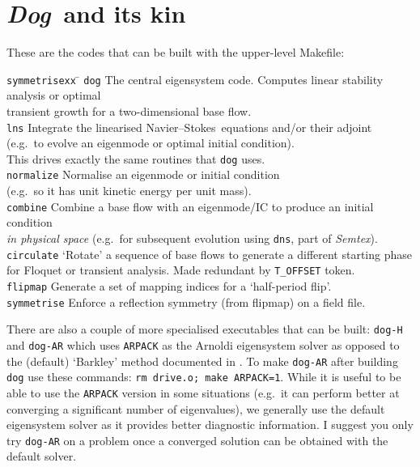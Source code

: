 \documentclass[11pt,a4paper]{report}
\newcommand\NavSto{Navier--Stokes}
\newcommand{\eg}{e.g.\ }
\newcommand{\Semtex}{\emph{Semtex}}
\newcommand{\Dog}{\emph{Dog}}
\begin{document}
\section{\Dog\ and its kin}

These are the codes that can be built with the upper-level Makefile:
\begin{tabbing}
\texttt{symmetrisexx} \= \kill
% 
\texttt{dog} 
\> The central eigensystem code. Computes linear stability analysis or 
optimal \\
\> transient growth for a two-dimensional base flow.\\
%
\texttt{lns} 
\> Integrate the linearised \NavSto\ equations and/or their adjoint\\ 
\> (\eg to evolve an eigenmode or optimal initial condition).\\ 
\> This drives exactly the same routines that \texttt{dog} uses.\\
%
\texttt{normalize} 
\> Normalise an eigenmode or initial condition \\
\> (\eg so it has unit kinetic energy per unit mass).\\
%
\texttt{combine} 
\> Combine a base flow with an eigenmode/IC to
produce an initial condition \\ \> \emph{in physical space} (\eg for
subsequent evolution using \texttt{dns}, part of \Semtex).\\
%
\texttt{circulate} 
\> `Rotate' a sequence of base flows to generate a different starting phase\\ 
\> for Floquet or transient analysis. 
   Made redundant by \verb+T_OFFSET+ token.\\
%
\texttt{flipmap} 
\> Generate a set of mapping indices for a `half-period flip'.\\
%
\texttt{symmetrise} 
\> Enforce a reflection symmetry (from flipmap) on a field file.
\end{tabbing}

There are also a couple of more specialised executables that can be
built: \texttt{dog-H} \citep[for computing stability with a
  half-period flip, see e.g.][]{bml05} and \texttt{dog-AR} which uses
\texttt{ARPACK} \citep{lehoucq98} as the Arnoldi eigensystem solver as
opposed to the (default) `Barkley' method documented in
\citet{bbs08b}.  To make \texttt{dog-AR} after building \texttt{dog}
use these commands: \verb+rm drive.o; make ARPACK=1+.  While it is
useful to be able to use the \texttt{ARPACK} version in some
situations (\eg it can perform better at converging a significant
number of eigenvalues), we generally use the default eigensystem
solver as it provides better diagnostic information.  I suggest you
only try \texttt{dog-AR} on a problem once a converged solution can be
obtained with the default solver.
\end{document}
